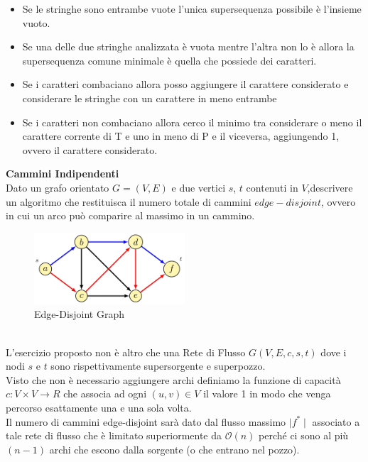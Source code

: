 \documentclass[../cheatSheetAlgoritmi.tex]{subfiles}
\begin{document}
\begin{itemize}
    \item Se le stringhe sono entrambe vuote l'unica supersequenza possibile è l'insieme vuoto.
    \item Se una delle due stringhe analizzata è vuota mentre l'altra non lo è allora la supersequenza comune minimale è quella che possiede dei caratteri. 
    \item Se i caratteri combaciano allora posso aggiungere il carattere considerato e considerare le stringhe con un carattere in meno entrambe
    \item Se i caratteri non combaciano allora cerco il minimo tra considerare o meno il carattere corrente di T e uno in meno di P e il viceversa, aggiungendo 1, ovvero il carattere considerato.
\end{itemize}
\textbf{Cammini Indipendenti}\\
Dato un grafo orientato $G= (V, E)$ e due vertici $s$, $t$ contenuti in $V$,descrivere un algoritmo che restituisca il numero totale di cammini $edge-disjoint$, ovvero in cui un arco può comparire al massimo in un cammino.
\begin{figure}[ht]
\caption{Edge-Disjoint Graph}
\centering
\includegraphics[width=0.5\textwidth]{../img/Locale_1.jpg}
\end{figure} \\
L'esercizio proposto non è altro che una Rete di Flusso $G(V, E, c, s, t)$ dove i nodi $s$ e $t$ sono rispettivamente supersorgente e superpozzo.\\
Visto che non è necessario aggiungere archi definiamo la funzione di capacità $c: V \times V \rightarrow R$  che associa ad ogni $(u, v) \in V$ il valore 1 in modo che venga percorso esattamente una e una sola volta.\\
Il numero di cammini edge-disjoint sarà dato dal flusso massimo $\mid f^* \mid$ associato a tale rete di flusso che è limitato superiormente da $\mathcal{O}(n)$ perché ci sono al più $(n-1)$ archi che escono dalla sorgente (o che entrano nel pozzo).
 
\end{document}

